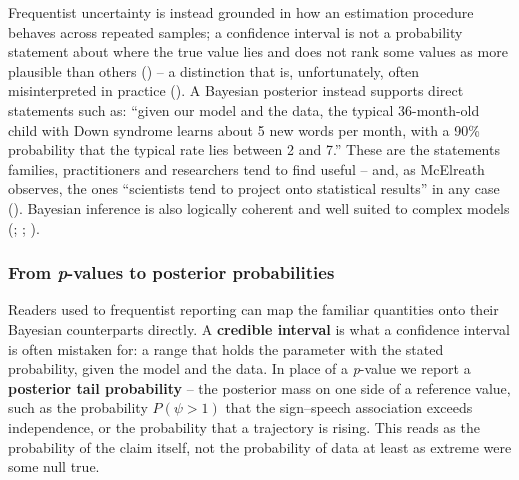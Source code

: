 \documentclass[
  11pt,
  a4paper,
]{report}
\begin{document}
Frequentist uncertainty is instead grounded in how an estimation
procedure behaves across repeated samples; a confidence interval is not
a probability statement about where the true value lies and does not
rank some values as more plausible than others
()
-- a distinction that is, unfortunately, often misinterpreted in
practice
(). A Bayesian posterior instead supports direct statements
such as: ``given our model and the data, the typical 36-month-old child
with Down syndrome learns about 5 new words per month, with a 90\%
probability that the typical rate lies between 2 and 7.'' These are the
statements families, practitioners and researchers tend to find useful
-- and, as McElreath observes, the ones ``scientists tend to project
onto statistical results'' in any case
(). Bayesian inference is also logically coherent and well suited to
complex models (;
;
).

\subsubsection{\texorpdfstring{From \emph{p}-values to posterior
probabilities}{From p-values to posterior probabilities}}\label{from-p-values-to-posterior-probabilities}

Readers used to frequentist reporting can map the familiar quantities
onto their Bayesian counterparts directly. A \textbf{credible interval}
is what a confidence interval is often mistaken for: a range that holds
the parameter with the stated probability, given the model and the data.
In place of a \emph{p}-value we report a \textbf{posterior tail
probability} -- the posterior mass on one side of a reference value,
such as the probability \(P(\psi > 1)\) that the sign--speech
association exceeds independence, or the probability that a trajectory
is rising. This reads as the probability of the claim itself, not the
probability of data at least as extreme were some null true.
\end{document}
